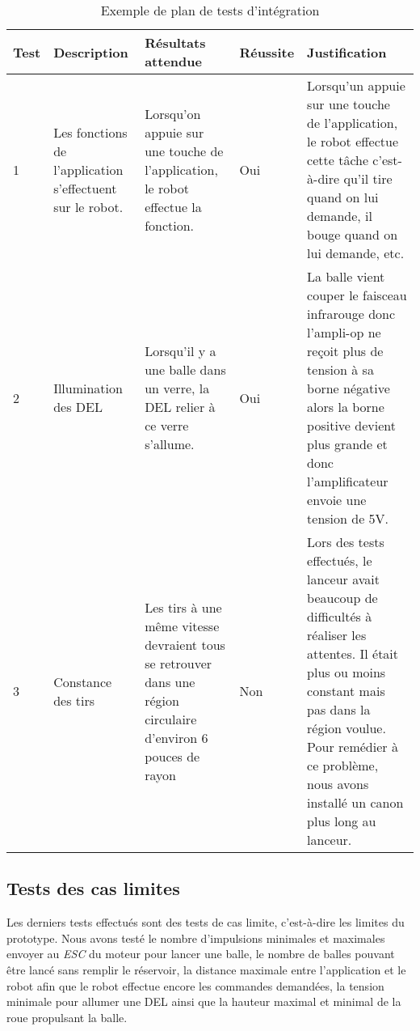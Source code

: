 \begin{table}[h!]
    \centering
    \begin{tabular}{p{0.25in}p{1.5in}p{1.5in}p{0.5in}p{1.5in}}
        \hline
        \bfseries Test & \bfseries Description & \bfseries Résultats attendue & \bfseries Réussite & \bfseries Justification \\
        \hline\hline
        1 & Les fonctions de l’application s’effectuent sur le robot. & Lorsqu’on appuie sur une touche de l’application, le robot effectue la fonction. & Oui & Lorsqu’un appuie sur une touche de l’application, le robot effectue cette tâche c’est-à-dire qu’il tire quand on lui demande, il bouge quand on lui demande, etc. \\
        2 & Illumination des DEL & Lorsqu’il y a une balle dans un verre, la DEL relier à ce verre s’allume. & Oui & La balle vient couper le faisceau infrarouge donc l’ampli-op ne reçoit plus de tension à sa borne négative alors la borne positive devient plus grande et donc l’amplificateur envoie une tension de 5V. \\
        3 & Constance des tirs & Les tirs à une même vitesse devraient tous se retrouver dans une région circulaire d’environ 6 pouces de rayon & Non & Lors des tests effectués, le lanceur avait beaucoup de difficultés à réaliser les attentes. Il était plus ou moins constant mais pas dans la région voulue. Pour remédier à ce problème, nous avons installé un canon plus long au lanceur. \\
        \hline
    \end{tabular}
    \caption{Exemple de plan de tests d'intégration}
    \label{tab:s3-test-integration}
\end{table}

\subsection{Tests des cas limites}

Les derniers tests effectués sont des tests de cas limite, c’est-à-dire les limites du prototype.
Nous avons testé le nombre d’impulsions minimales et maximales envoyer au \emph{ESC} du moteur pour lancer une balle, le nombre de balles pouvant être lancé sans remplir le réservoir, la distance maximale entre l’application et le robot afin que le robot effectue encore les commandes demandées, la tension minimale pour allumer une DEL ainsi que la hauteur maximal et minimal de la roue propulsant la balle.

